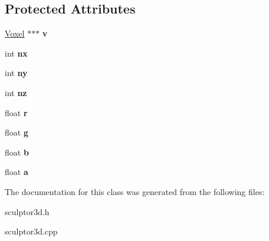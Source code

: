 \subsection*{Protected Attributes}
\begin{DoxyCompactItemize}
\item 
\mbox{\label{classsculptor3d_aa203c37fa6a40ce6a96b818b999291f0}} 
\mbox{\hyperlink{struct_voxel}{Voxel}} $\ast$$\ast$$\ast$ {\bfseries v}
\item 
\mbox{\label{classsculptor3d_ae609eab63f0f21d15e2713928001212c}} 
int {\bfseries nx}
\item 
\mbox{\label{classsculptor3d_a270d21a9e67e1bf6cc7103c9c6356c0f}} 
int {\bfseries ny}
\item 
\mbox{\label{classsculptor3d_a64f2963f1cb9e3a2ce0cce2c085ca7a2}} 
int {\bfseries nz}
\item 
\mbox{\label{classsculptor3d_ac9efb16a4567c5823eb5d0e1bc44c103}} 
float {\bfseries r}
\item 
\mbox{\label{classsculptor3d_ad7e2e9e417b52b665de53ec8dbcc8388}} 
float {\bfseries g}
\item 
\mbox{\label{classsculptor3d_a183f4013dfd30806b881363dc6bef47e}} 
float {\bfseries b}
\item 
\mbox{\label{classsculptor3d_a899685e3854e58c2eb44b8a4b7f78455}} 
float {\bfseries a}
\end{DoxyCompactItemize}


The documentation for this class was generated from the following files\+:\begin{DoxyCompactItemize}
\item 
sculptor3d.\+h\item 
sculptor3d.\+cpp\end{DoxyCompactItemize}
